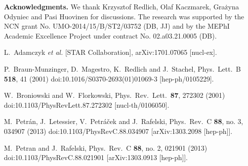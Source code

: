 \documentclass[12pt]{article}
\begin{document}

{\bf Acknowledgments.}
 We thank Krzysztof Redlich, Olaf Kaczmarek, Gra{\.z}yna Odyniec and Pasi Huovinen  for discussions.
 The research was supported
 by the NCN grant No. UMO-2014/15/B/ST2/03752 (DB, JJ)
and by the MEPhI Academic Excellence Project under contract No. 02.a03.21.0005 (DB). 

\begin{thebibliography}{99}


  L.~Adamczyk {\it et al.} [STAR Collaboration],
  arXiv:1701.07065 [nucl-ex].

  P.~Braun-Munzinger, D.~Magestro, K.~Redlich and J.~Stachel,
  Phys.\ Lett.\ B {\bf 518}, 41 (2001)
  doi:10.1016/S0370-2693(01)01069-3
  [hep-ph/0105229].
		
  W.~Broniowski and W.~Florkowski,
  Phys.\ Rev.\ Lett.\  {\bf 87}, 272302 (2001)
  doi:10.1103/PhysRevLett.87.272302
  [nucl-th/0106050].

  M.~Petrán, J.~Letessier, V.~Petráček and J.~Rafelski,
  Phys.\ Rev.\ C {\bf 88}, no. 3, 034907 (2013)
  doi:10.1103/PhysRevC.88.034907
  [arXiv:1303.2098 [hep-ph]].
	
  M.~Petran and J.~Rafelski,
  Phys.\ Rev.\ C {\bf 88}, no. 2, 021901 (2013)
  doi:10.1103/PhysRevC.88.021901
  [arXiv:1303.0913 [hep-ph]].


\end{thebibliography}
\end{document}

